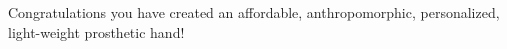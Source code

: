 {\large Congratulations you have created an affordable, anthropomorphic, personalized, light-weight prosthetic hand!}

\begin{center}
\end{center} 
		